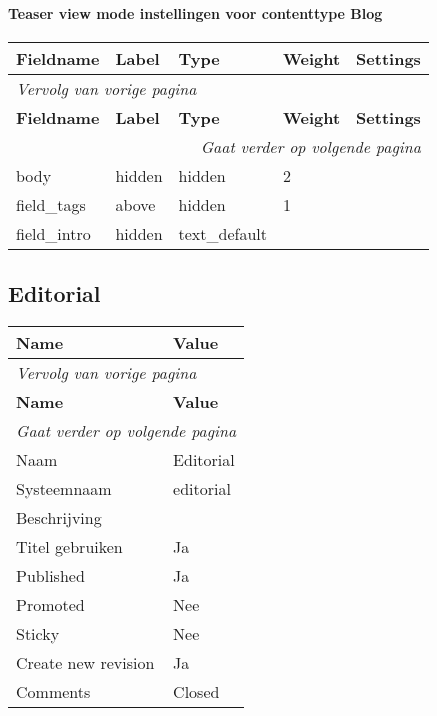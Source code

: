 \paragraph{Teaser view mode instellingen voor contenttype Blog }

  \begin{longtable}{| p{3.00cm}|p{3.00cm}|p{3.00cm}|p{3.00cm}|p{3.00cm}|}
  \hline
  \rowcolor{tableheader}
  \textbf{Fieldname} & \textbf{Label} & \textbf{Type} & \textbf{Weight} & \textbf{Settings}  \tabularnewline
  \hline
\endfirsthead
\multicolumn{5}{l}{\textit{Vervolg van vorige pagina}} \\
\hline
\rowcolor{tableheader}
  \textbf{Fieldname} & \textbf{Label} & \textbf{Type} & \textbf{Weight} & \textbf{Settings}  \tabularnewline
  \hline
\hline
\endhead
\multicolumn{5}{r}{\textit{Gaat verder op volgende pagina}} \\
\endfoot
\hline
\endlastfoot
  body & hidden & hidden & 2 &    \tabularnewline
  \hline
  field\_tags & above & hidden & 1 &    \tabularnewline
  \hline
  field\_intro & hidden & text\_default &   &    \tabularnewline
  \hline
  \end{longtable}

\subsection{Editorial}
\label{sec:content-editorial}
  \begin{longtable}{| p{7.50cm}|p{7.50cm}|}
  \hline
  \rowcolor{tableheader}
  \textbf{Name} & \textbf{Value}  \tabularnewline
  \hline
\endfirsthead
\multicolumn{2}{l}{\textit{Vervolg van vorige pagina}} \\
\hline
\rowcolor{tableheader}
  \textbf{Name} & \textbf{Value}  \tabularnewline
  \hline
\hline
\endhead
\multicolumn{2}{r}{\textit{Gaat verder op volgende pagina}} \\
\endfoot
\hline
\endlastfoot
  Naam & Editorial  \tabularnewline
  \hline
  Systeemnaam & editorial  \tabularnewline
  \hline
  Beschrijving &   \tabularnewline
  \hline
  Titel gebruiken & Ja  \tabularnewline
  \hline
  Published & Ja  \tabularnewline
  \hline
  Promoted & Nee  \tabularnewline
  \hline
  Sticky & Nee  \tabularnewline
  \hline
  Create new revision & Ja  \tabularnewline
  \hline
  Comments & Closed  \tabularnewline
  \hline
  \end{longtable}

